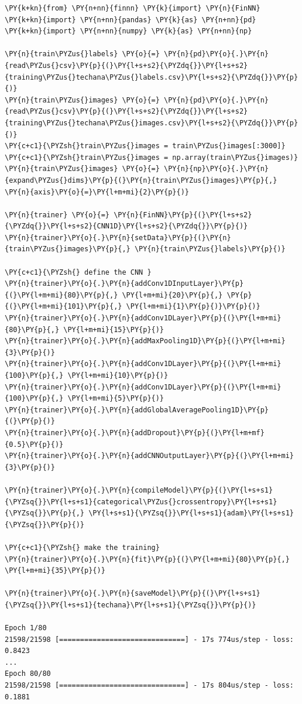     \begin{tcolorbox}[breakable, size=fbox, boxrule=1pt, pad at break*=1mm,colback=cellbackground, colframe=cellborder]
\begin{Verbatim}[commandchars=\\\{\}]
\PY{k+kn}{from} \PY{n+nn}{finnn} \PY{k}{import} \PY{n}{FinNN}
\PY{k+kn}{import} \PY{n+nn}{pandas} \PY{k}{as} \PY{n+nn}{pd}
\PY{k+kn}{import} \PY{n+nn}{numpy} \PY{k}{as} \PY{n+nn}{np}

\PY{n}{train\PYZus{}labels} \PY{o}{=} \PY{n}{pd}\PY{o}{.}\PY{n}{read\PYZus{}csv}\PY{p}{(}\PY{l+s+s2}{\PYZdq{}}\PY{l+s+s2}{training\PYZus{}techana\PYZus{}labels.csv}\PY{l+s+s2}{\PYZdq{}}\PY{p}{)}
\PY{n}{train\PYZus{}images} \PY{o}{=} \PY{n}{pd}\PY{o}{.}\PY{n}{read\PYZus{}csv}\PY{p}{(}\PY{l+s+s2}{\PYZdq{}}\PY{l+s+s2}{training\PYZus{}techana\PYZus{}images.csv}\PY{l+s+s2}{\PYZdq{}}\PY{p}{)}
\PY{c+c1}{\PYZsh{}train\PYZus{}images = train\PYZus{}images[:3000]}
\PY{c+c1}{\PYZsh{}train\PYZus{}images = np.array(train\PYZus{}images)}
\PY{n}{train\PYZus{}images} \PY{o}{=} \PY{n}{np}\PY{o}{.}\PY{n}{expand\PYZus{}dims}\PY{p}{(}\PY{n}{train\PYZus{}images}\PY{p}{,} \PY{n}{axis}\PY{o}{=}\PY{l+m+mi}{2}\PY{p}{)}

\PY{n}{trainer} \PY{o}{=} \PY{n}{FinNN}\PY{p}{(}\PY{l+s+s2}{\PYZdq{}}\PY{l+s+s2}{CNN1D}\PY{l+s+s2}{\PYZdq{}}\PY{p}{)}
\PY{n}{trainer}\PY{o}{.}\PY{n}{setData}\PY{p}{(}\PY{n}{train\PYZus{}images}\PY{p}{,} \PY{n}{train\PYZus{}labels}\PY{p}{)}

\PY{c+c1}{\PYZsh{} define the CNN }
\PY{n}{trainer}\PY{o}{.}\PY{n}{addConv1DInputLayer}\PY{p}{(}\PY{l+m+mi}{80}\PY{p}{,} \PY{l+m+mi}{20}\PY{p}{,} \PY{p}{(}\PY{l+m+mi}{101}\PY{p}{,} \PY{l+m+mi}{1}\PY{p}{)}\PY{p}{)}
\PY{n}{trainer}\PY{o}{.}\PY{n}{addConv1DLayer}\PY{p}{(}\PY{l+m+mi}{80}\PY{p}{,} \PY{l+m+mi}{15}\PY{p}{)}
\PY{n}{trainer}\PY{o}{.}\PY{n}{addMaxPooling1D}\PY{p}{(}\PY{l+m+mi}{3}\PY{p}{)}
\PY{n}{trainer}\PY{o}{.}\PY{n}{addConv1DLayer}\PY{p}{(}\PY{l+m+mi}{100}\PY{p}{,} \PY{l+m+mi}{10}\PY{p}{)}
\PY{n}{trainer}\PY{o}{.}\PY{n}{addConv1DLayer}\PY{p}{(}\PY{l+m+mi}{100}\PY{p}{,} \PY{l+m+mi}{5}\PY{p}{)}
\PY{n}{trainer}\PY{o}{.}\PY{n}{addGlobalAveragePooling1D}\PY{p}{(}\PY{p}{)}
\PY{n}{trainer}\PY{o}{.}\PY{n}{addDropout}\PY{p}{(}\PY{l+m+mf}{0.5}\PY{p}{)}
\PY{n}{trainer}\PY{o}{.}\PY{n}{addCNNOutputLayer}\PY{p}{(}\PY{l+m+mi}{3}\PY{p}{)}

\PY{n}{trainer}\PY{o}{.}\PY{n}{compileModel}\PY{p}{(}\PY{l+s+s1}{\PYZsq{}}\PY{l+s+s1}{categorical\PYZus{}crossentropy}\PY{l+s+s1}{\PYZsq{}}\PY{p}{,} \PY{l+s+s1}{\PYZsq{}}\PY{l+s+s1}{adam}\PY{l+s+s1}{\PYZsq{}}\PY{p}{)}

\PY{c+c1}{\PYZsh{} make the training}
\PY{n}{trainer}\PY{o}{.}\PY{n}{fit}\PY{p}{(}\PY{l+m+mi}{80}\PY{p}{,} \PY{l+m+mi}{35}\PY{p}{)}

\PY{n}{trainer}\PY{o}{.}\PY{n}{saveModel}\PY{p}{(}\PY{l+s+s1}{\PYZsq{}}\PY{l+s+s1}{techana}\PY{l+s+s1}{\PYZsq{}}\PY{p}{)}

Epoch 1/80
21598/21598 [==============================] - 17s 774us/step - loss: 0.8423
...
Epoch 80/80
21598/21598 [==============================] - 17s 804us/step - loss: 0.1881
    \end{Verbatim}
\end{tcolorbox}

